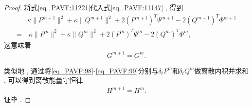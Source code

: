 \begin{proof}
将式\eqref{eq_PAVF:11221}代入式\eqref{eq_PAVF:11147} , 得到
\begin{align}
&\kappa \|P^{m+1}\|^2+\kappa \|Q^{m+1}\|^2+2(P^{m+1})^{T}\Psi^{m+1}-2(Q^{m+1})^{T}\varPhi^{m+1}\nonumber
\\=&~\kappa \|P^{m}\|^2+\kappa \|Q^{m}\|^2+2(P^{m})^{T}\Psi^{m}-2(Q^{m})^{T}\varPhi^{m} , \label{eq_PAVF:11155}
\end{align}
这意味着
\begin{align}\label{eq_PAVF:11149}
G^{m+1}=G^{m}  . 
\end{align}

类似地 , 通过将\eqref{eq_PAVF:98}-\eqref{eq_PAVF:99}分别与$\delta_t P^{m}$和$\delta_t Q^{m}$做离散内积并求和 , 可以得到离散能量守恒律
\begin{align}\label{eq_PAVF:11156}
H^{m+1}=H^{m} . 
\end{align}
证毕 . 
\end{proof}

